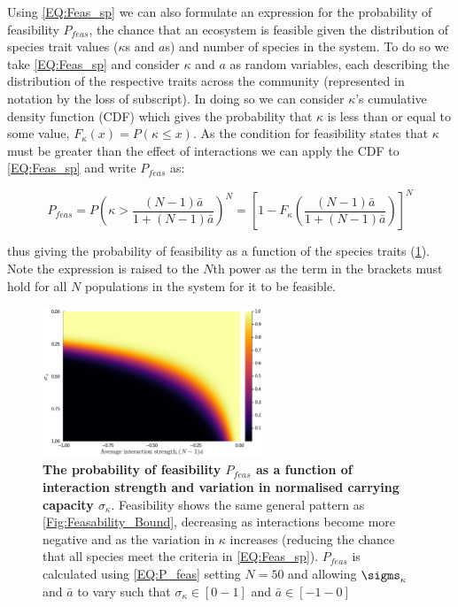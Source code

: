 \documentclass{article}
\begin{document}
Using \cref{EQ:Feas_sp} we can also formulate an expression for the probability of feasibility $P_{feas}$, the chance that an ecosystem is feasible given the distribution of species trait values ($\kappa$s and $a$s) and number of species in the system. To do so we take \cref{EQ:Feas_sp} and consider $\kappa$ and $a$ as random variables, each describing the distribution of the respective traits across the community (represented in notation by the loss of subscript). In doing so we can consider $\kappa$'s cumulative density function (CDF) which gives the probability that $\kappa$ is less than or equal to some value, $F_{\kappa}(x) = P(\kappa \leq x)$. As the condition for feasibility states that $\kappa$ must be greater than the effect of interactions we can apply the CDF to \cref{EQ:Feas_sp} and write $P_{feas}$ as:

\begin{equation} \label{EQ:P_feas}
    P_{feas} = P \left( \kappa > \frac{(N-1)\bar{a}}{1 + (N-1)\bar{a}}  \right)^N = 
    \left[1 - F_{\kappa}\left(\frac{(N-1)\bar{a}}{1 + (N-1)\bar{a}}\right)\right]^N
\end{equation}

thus giving the probability of feasibility as a function of the species traits (\cref{Fig:P_feas}). Note the expression is raised to the $N$th power as the term in the brackets must hold for all $N$ populations in the system for it to be feasible. 

\begin{figure}
    \centering
    \includegraphics[width = 0.6\textwidth]{docs/Figures/Fig_2.pdf}
    \caption{\textbf{The probability of feasibility $P_{feas}$ as a function of interaction strength and variation in normalised carrying capacity $\sigma_{\kappa}$}. Feasibility shows the same general pattern as \cref{Fig:Feasability_Bound}, decreasing as interactions become more negative and as the variation in $\kappa$ increases (reducing the chance that all species meet the criteria in \cref{EQ:Feas_sp}). $P_{feas}$ is calculated using \cref{EQ:P_feas} setting $N=50$ and allowing $\sigms_{\kappa}$ and $\bar{a}$ to vary such that $\sigma_{\kappa} \in [0 - 1]$ and $\bar{a} \in [-1 - 0]$}
    \label{Fig:P_feas}
\end{figure}
\end{document}
